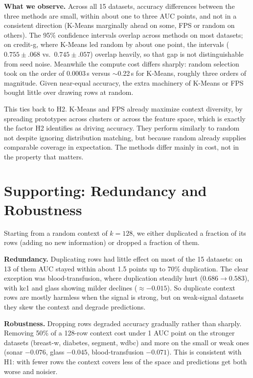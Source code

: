 \documentclass[11pt,a4paper]{article}
\begin{document}
\textbf{What we observe.} Across all 15 datasets, accuracy differences between the
three methods are small, within about one to three AUC points, and not in a
consistent direction (K-Means marginally ahead on some, FPS or random on others).
The 95\% confidence intervals overlap across methods on most datasets; on
credit-g, where K-Means led random by about one point, the intervals
($0.755{\pm}.068$ vs.\ $0.745{\pm}.057$) overlap heavily, so that gap is not
distinguishable from seed noise. Meanwhile the compute cost differs sharply:
random selection took on the order of $0.0003$\,s versus $\sim$0.22\,s for
K-Means, roughly three orders of magnitude. Given near-equal accuracy, the extra
machinery of K-Means or FPS bought little over drawing rows at random.

This ties back to H2. K-Means and FPS already maximize context diversity, by
spreading prototypes across clusters or across the feature space, which is
exactly the factor H2 identifies as driving accuracy. They perform similarly to
random not despite ignoring distribution matching, but because random already
supplies comparable coverage in expectation. The methods differ mainly in cost,
not in the property that matters.

\section{Supporting: Redundancy and Robustness}

Starting from a random context of $k{=}128$, we either duplicated a fraction of
its rows (adding no new information) or dropped a fraction of them.

\textbf{Redundancy.} Duplicating rows had little effect on most of the 15
datasets: on 13 of them AUC stayed within about 1.5 points up to 70\%
duplication. The clear exception was blood-transfusion, where duplication
steadily hurt ($0.686\rightarrow0.583$), with kc1 and glass showing milder
declines ($\approx-0.015$). So duplicate context rows are mostly harmless when
the signal is strong, but on weak-signal datasets they skew the context and
degrade predictions.

\textbf{Robustness.} Dropping rows degraded accuracy gradually rather than
sharply. Removing 50\% of a 128-row context cost under 1 AUC point on the
stronger datasets (breast-w, diabetes, segment, wdbc) and more on the small or
weak ones (sonar $-0.076$, glass $-0.045$, blood-transfusion $-0.071$). This is
consistent with H1: with fewer rows the context covers less of the space and
predictions get both worse and noisier.
\end{document}
